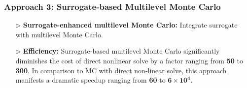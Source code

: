 \documentclass{beamer}
\begin{document}
\begin{frame}[t]
    \frametitle{Approach 3: Surrogate-based Multilevel Monte Carlo}
\begin{itemize}[leftmargin=5pt] 
\item[$\triangleright$] \textcolor{myblue3}{\bf Surrogate-enhanced multilevel Monte Carlo:} {\footnotesize Integrate surrogate with multilevel Monte Carlo.}
\item[$\triangleright$] \textcolor{myblue3}{\bf Efficiency:} {\footnotesize 
 Surrogate-based multilevel Monte Carlo significantly diminishes the cost of direct nonlinear solve by a factor ranging from {\bf 50} to {\bf 300}. In comparison to MC with direct non-linear solve, this approach manifests a dramatic speedup ranging from {\bf 60} to $\boldsymbol{6\times 10^4}$.}
 \vspace{3mm}
\begin{figure}[ht!]\centering
{}
\label{fig:Experiment_result_plot}
\end{figure}

\end{itemize}
\end{frame}
 
\end{document}
